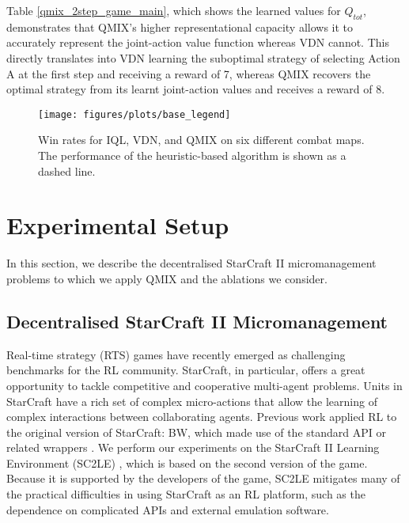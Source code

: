 \documentclass{article}
\begin{document}
Table \ref{qmix_2step_game_main}, which shows the learned values for $Q_{tot}$, demonstrates that QMIX's higher representational capacity allows it to accurately represent the joint-action value function whereas VDN cannot. This directly translates into VDN learning the suboptimal strategy of selecting Action A at the first step and receiving a reward of 7, whereas QMIX recovers the optimal strategy from its learnt joint-action values and receives a reward of 8. 

\begin{figure*}[htb!]
    \centering
    \texttt{[image: figures/plots/base\_legend]}
    \vfill
    \\
    \caption{Win rates for IQL, VDN, and QMIX on six different combat maps. The performance of the heuristic-based algorithm is shown as a dashed line.}
    \label{fig:starcraft_res}
\end{figure*}

\section{Experimental Setup}
\label{sec:setting}

In this section, we describe the decentralised StarCraft II micromanagement problems to which we apply QMIX and the ablations we consider.

\subsection{Decentralised StarCraft II Micromanagement} 
Real-time strategy (RTS) games have recently emerged as challenging benchmarks for the RL community. 
StarCraft, in particular, offers a great opportunity to tackle competitive and cooperative multi-agent problems.
Units in StarCraft have a rich set of complex micro-actions that allow the learning of complex interactions between collaborating agents. 
Previous work \cite{usunier_episodic_2016, foerster_counterfactual_2017, peng_multiagent_2017} applied RL to the original version of StarCraft: BW, which made use of the standard API or related wrappers \cite{synnaeve_torchcraft_2016}. 
We perform our experiments on the StarCraft II Learning Environment (SC2LE) \cite{vinyals_starcraft_2017}, which is based on the second version of the game. 
Because it is supported by the developers of the game, SC2LE mitigates many of the practical difficulties in using StarCraft as an RL platform, such as the dependence on complicated APIs and external emulation software.
\end{document}
